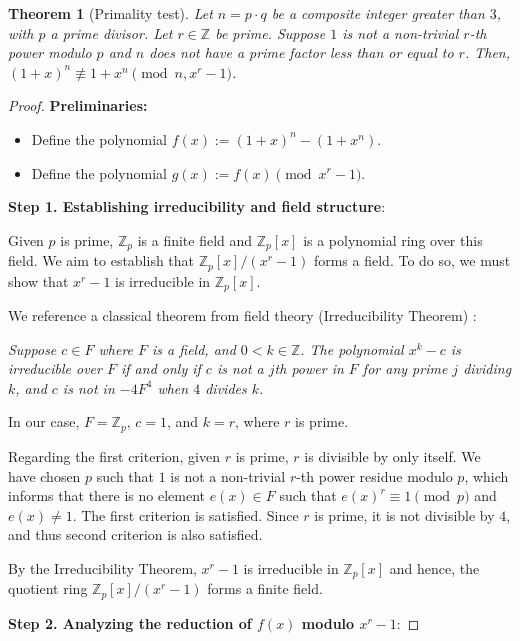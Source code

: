 \documentclass{article}
\theoremstyle{plain}
\theoremstyle{definition}
\newtheorem{theorem}{Theorem}
\newcommand{\D}{r}
\begin{document}
\begin{theorem}[Primality test] \label{theorem:composites}
\textit{Let $n = p \cdot q$ be a composite integer greater than $3$, with $p$ a prime divisor. Let $\D \in \mathbb{Z}$ be prime. Suppose $1$ is not a non-trivial $\D$-th power modulo $p$ and $n$ does not have a prime factor less than or equal to $\D$. Then, $(1 + x)^n \not\equiv 1 + x^n \pmod{n, x^{\D} - 1}$.}
\end{theorem}
\begin{proof}
\textbf{Preliminaries:}
\begin{itemize}
    \item Define the polynomial $f(x) := (1 + x)^n - (1 + x^n)$.
    \item Define the polynomial $g(x) := f(x) \pmod{x^{\D} - 1}$.
\end{itemize}

\textbf{Step 1. Establishing irreducibility and field structure}:

Given $p$ is prime, $\mathbb{Z}_p$ is a finite field and $\mathbb{Z}_p[x]$ is a polynomial ring over this field. We aim to establish that $\mathbb{Z}_p[x]/(x^{\D}-1)$ forms a field. To do so, we must show that $x^{\D}-1$ is irreducible in $\mathbb{Z}_p[x]$.

We reference a classical theorem from field theory (Irreducibility Theorem) \cite{karpilovsky1989fields}:

\textit{Suppose $c \in F$ where $F$ is a field, and $0 < k \in \mathbb{Z}$. The polynomial $x^k - c$ is irreducible over $F$ if and only if $c$ is not a $j$th power in $F$ for any prime $j$ dividing $k$, and $c$ is not in $-4F^4$ when $4$ divides $k$.}

In our case, $F = \mathbb{Z}_p$, $c = 1$, and $k = \D$, where $\D$ is prime.

Regarding the first criterion, given $\D$ is prime, $\D$ is divisible by only itself. We have chosen $p$ such that $1$ is not a non-trivial $\D$-th power residue modulo $p$, which informs that there is no element $e(x) \in F$ such that $e(x)^{\D} \equiv 1 \pmod{p}$ and $e(x) \not= 1$. The first criterion is satisfied. Since $\D$ is prime, it is not divisible by $4$, and thus second criterion is also satisfied.

By the Irreducibility Theorem, $x^{\D}-1$ is irreducible in $\mathbb{Z}_p[x]$ and hence, the quotient ring $\mathbb{Z}_p[x]/(x^{\D}-1)$ forms a finite field.

\textbf{Step 2. Analyzing the reduction of $f(x)$ modulo $x^\D - 1$}:


\end{proof}
\end{document}
